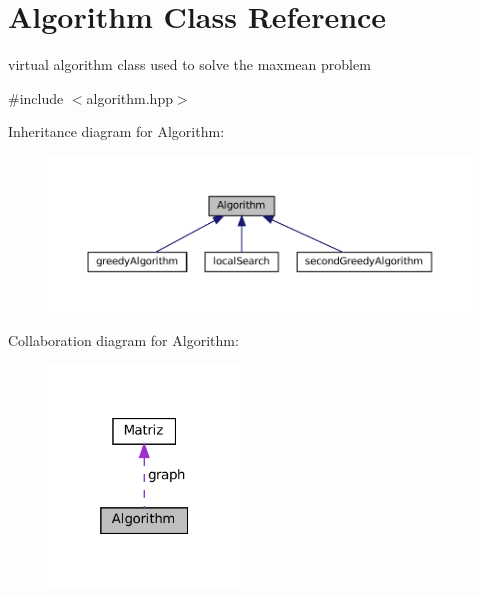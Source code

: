\hypertarget{classAlgorithm}{}\section{Algorithm Class Reference}
\label{classAlgorithm}


virtual algorithm class used to solve the maxmean problem  




{\ttfamily \#include $<$algorithm.\+hpp$>$}



Inheritance diagram for Algorithm\+:
\nopagebreak
\begin{figure}[H]
\begin{center}
\leavevmode
\includegraphics[width=350pt]{classAlgorithm__inherit__graph}
\end{center}
\end{figure}


Collaboration diagram for Algorithm\+:
\nopagebreak
\begin{figure}[H]
\begin{center}
\leavevmode
\includegraphics[width=145pt]{classAlgorithm__coll__graph}
\end{center}
\end{figure}
